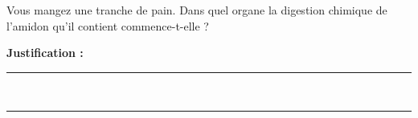 Vous mangez une tranche de pain. Dans quel organe la digestion chimique de l'amidon qu'il contient commence-t-elle ?

\choices

\noindent\textbf{Justification :} \hrulefill \\[2.5ex]
\rule{\linewidth}{0.4pt} \\[2.5ex]
\rule{\linewidth}{0.4pt}
\vfill
